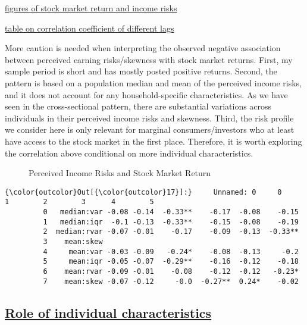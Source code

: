 \documentclass[12pt,notitlepage,onecolumn,aps,pra]{revtex4-1}
\begin{document}
\href{../Graphs/pop/ts.jpg}{figures of stock market return and income
risks}

\href{../Tables/latex/macro_corr.tex}{table on correlation coefficient
of different lags}

More caution is needed when interpreting the observed negative
association between perceived earning risks/skewness with stock market
returns. First, my sample period is short and has mostly posted positive
returns. Second, the pattern is based on a population median and mean of
the perceived income risks, and it does not account for any
household-specific characteristics. As we have seen in the
cross-sectional pattern, there are substantial variations across
individuals in their perceived income risks and skewness. Third, the
risk profile we consider here is only relevant for marginal
consumers/investors who at least have access to the stock market in the
first place. Therefore, it is worth exploring the correlation above
conditional on more individual characteristics.


    \begin{figure*}
        \begin{center}\end{center}
        \caption{Perceived Income Risks and Stock Market Return}
        \label{fig:tssp500}
    \end{figure*}
    

\begin{Verbatim}[commandchars=\\\{\}]
{\color{outcolor}Out[{\color{outcolor}17}]:}     Unnamed: 0     0     1        2        3      4        5
         0   median:var -0.08 -0.14  -0.33**    -0.17  -0.08    -0.15
         1   median:iqr  -0.1 -0.13  -0.33**    -0.15  -0.08    -0.19
         2  median:rvar -0.07 -0.01    -0.17    -0.09  -0.13  -0.33**
         3    mean:skew                                              
         4     mean:var -0.03 -0.09   -0.24*    -0.08  -0.13     -0.2
         5     mean:iqr -0.05 -0.07  -0.29**    -0.16  -0.12    -0.18
         6    mean:rvar -0.09 -0.01    -0.08    -0.12  -0.12   -0.23*
         7    mean:skew -0.07 -0.12     -0.0  -0.27**  0.24*    -0.02
\end{Verbatim}
            
    \hypertarget{role-of-individual-characteristics}{%
\subsection{\texorpdfstring{\href{MicroRiskProfile.ipynb}{Role of
individual
characteristics}}{Role of individual characteristics}}\label{role-of-individual-characteristics}}
\end{document}
